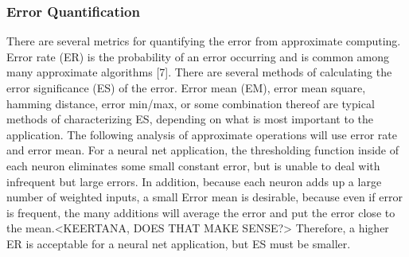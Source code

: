 \documentclass[conference]{IEEEtran}
\begin{document}
	\subsubsection{Error Quantification}
	\indent 	There are several metrics for quantifying the error from approximate computing. Error rate (ER) is the probability of an error occurring and is common among many approximate algorithms [7]. There are several methods of calculating the error significance (ES) of the error. Error mean (EM), error mean square, hamming distance, error min/max, or some combination thereof are typical methods of characterizing ES, depending on what is most important to the application. The following analysis of approximate operations will use error rate and error mean. For a neural net application, the thresholding function inside of each neuron eliminates some small constant error, but is unable to deal with infrequent but large errors. In addition, because each neuron adds up a large number of weighted inputs, a small Error mean is desirable, because even if error is frequent, the many additions will average the error and put the error close to the mean.<KEERTANA, DOES THAT MAKE SENSE?>  Therefore, a higher ER is acceptable for a neural net application, but ES must be smaller. \\	
	
\end{document}
